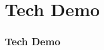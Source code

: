 \documentclass{beamer}
\begin{document}
\section{Tech Demo}
\begin{frame}
    \frametitle{Tech Demo}
\end{frame}
\end{document}
